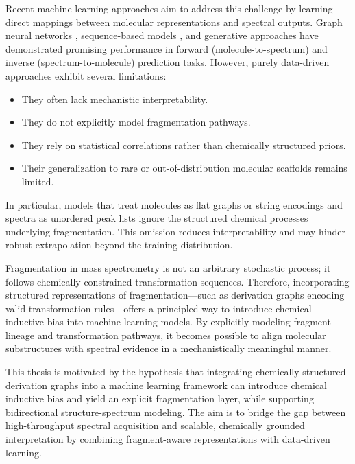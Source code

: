 Recent machine learning approaches aim to address this challenge by learning direct mappings between molecular representations and spectral outputs.
Graph neural networks \cite{Young2024}, sequence-based models \cite[p.~966]{Goldman2023}, and generative approaches have demonstrated promising performance in forward (molecule-to-spectrum) and inverse (spectrum-to-molecule) prediction tasks.
However, purely data-driven approaches exhibit several limitations:
\begin{itemize}
    \item They often lack mechanistic interpretability. \cite[p.~3\&~6]{Nowatzky2025}
    \item They do not explicitly model fragmentation pathways. \cite[p.~3]{Nowatzky2025}
    \item They rely on statistical correlations rather than chemically structured priors. \cite[p.~966]{Goldman2023}
    \item Their generalization to rare or out-of-distribution molecular scaffolds remains limited. \cite[p.~12]{Russo2024}
\end{itemize}

In particular, models that treat molecules as flat graphs or string encodings and spectra as unordered peak lists ignore the structured chemical processes underlying fragmentation.
This omission reduces interpretability and may hinder robust extrapolation beyond the training distribution.
\cite[p.~3420]{Goldman2024}

Fragmentation in mass spectrometry is not an arbitrary stochastic process; it follows chemically constrained transformation sequences. \cite[ch.~4\&~8]{McLafferty1993}
Therefore, incorporating structured representations of fragmentation—such as derivation graphs encoding valid transformation rules—offers a principled way to introduce chemical inductive bias into machine learning models.
By explicitly modeling fragment lineage and transformation pathways, it becomes possible to align molecular substructures with spectral evidence in a mechanistically meaningful manner.

This thesis is motivated by the hypothesis that integrating chemically structured derivation graphs into a machine learning framework can introduce chemical inductive bias and yield an explicit fragmentation layer, while supporting bidirectional structure-spectrum modeling.
The aim is to bridge the gap between high-throughput spectral acquisition and scalable, chemically grounded interpretation by combining fragment-aware representations with data-driven learning.

